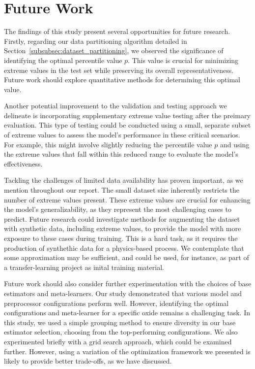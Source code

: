 \section{Future Work}\label{sec:future_work}
The findings of this study present several opportunities for future research.
Firstly, regarding our data partitioning algorithm detailed in Section~\ref{subsubsec:dataset_partitioning}, we observed the significance of identifying the optimal percentile value $p$. 
This value is crucial for minimizing extreme values in the test set while preserving its overall representativeness.
Future work should explore quantitative methods for determining this optimal value.

Another potential improvement to the validation and testing approach we delineate is incorporating supplementary extreme value testing after the preimary evaluation.
This type of testing could be conducted using a small, separate subset of extreme values to assess the model's performance in these critical scenarios.
For example, this might involve slightly reducing the percentile value $p$ and using the extreme values that fall within this reduced range to evaluate the model's effectiveness.

Tackling the challenges of limited data availability has proven important, as we mention throughout our report.
The small dataset size inherently restricts the number of extreme values present.
These extreme values are crucial for enhancing the model's generalizability, as they represent the most challenging cases to predict.
Future research could investigate methods for augmenting the dataset with synthetic data, including extreme values, to provide the model with more exposure to these cases during training.
This is a hard task, as it requires the production of synthethic data for a physics-based process.
We contemplate that some approximation may be sufficient, and could be used, for instance, as part of a transfer-learning project as inital training material.

Future work should also consider further experimentation with the choices of base estimators and meta-learners.
Our study demonstrated that various model and preprocessor configurations perform well.
However, identifying the optimal configurations and meta-learner for a specific oxide remains a challenging task.
In this study, we used a simple grouping method to ensure diversity in our base estimator selection, choosing from the top-performing configurations.
We also experimented briefly with a grid search approach, which could be examined further.
However, using a variation of the optimization framework we presented is likely to provide better trade-offs, as we have discussed.